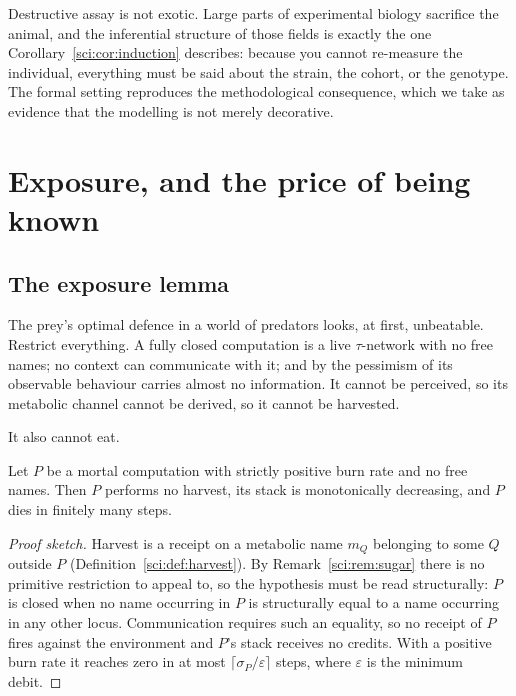 \begin{remark}\label{sci:biological-reading}
Destructive assay is not exotic. Large parts of experimental biology sacrifice the animal, and the
inferential structure of those fields is exactly the one Corollary~\ref{sci:cor:induction} describes:
because you cannot re-measure the individual, everything must be said about the strain, the cohort, or
the genotype. The formal setting reproduces the methodological consequence, which we take as evidence
that the modelling is not merely decorative.
\end{remark}

\section{Exposure, and the price of being known}\label{sci:S9}
\label{sci:sec:exposure}

\subsection{The exposure lemma}\label{sci:S9.1}

The prey's optimal defence in a world of predators looks, at first, unbeatable. Restrict everything.
A fully closed computation is a live $\tau$-network with no free names; no context can communicate
with it; and by the pessimism of \cite[\S1]{ClassifierNote} its observable behaviour carries almost no
information. It cannot be perceived, so its metabolic channel cannot be derived, so it cannot be
harvested.

It also cannot eat.

\begin{lemma}[Exposure]
\label{sci:lem:exposure}
Let $P$ be a mortal computation with strictly positive burn rate and no free names. Then $P$ performs
no harvest, its stack is monotonically decreasing, and $P$ dies in finitely many steps.
\end{lemma}

\begin{proof}[Proof sketch]
Harvest is a receipt on a metabolic name $m_Q$ belonging to some $Q$ outside $P$
(Definition~\ref{sci:def:harvest}). By Remark~\ref{sci:rem:sugar} there is no primitive restriction to appeal
to, so the hypothesis must be read structurally: $P$ is closed when no name occurring in $P$ is
structurally equal to a name occurring in any other locus. Communication requires such an equality, so
no receipt of $P$ fires against the environment and $P$'s stack receives no credits. With a positive
burn rate it reaches zero in at most $\lceil \sigma_P / \varepsilon \rceil$ steps, where $\varepsilon$
is the minimum debit.
\end{proof}

